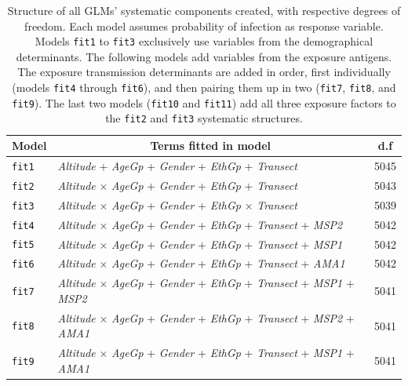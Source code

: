 \begin{table}[ht!]
\centering
\caption[Structure of systematic components used in the GLMs]{Structure of all GLMs' systematic components created, with respective degrees of freedom. Each model assumes probability of infection as response variable. Models \texttt{fit1} to \texttt{fit3} exclusively use variables from the demographical determinants. The following models add variables from the exposure antigens. The exposure transmission determinants are added in order, first individually (models \texttt{fit4} through \texttt{fit6}), and then pairing them up in two (\texttt{fit7}, \texttt{fit8}, and \texttt{fit9}). The last two models (\texttt{fit10} and \texttt{fit11}) add all three exposure factors to the \texttt{fit2} and \texttt{fit3} systematic structures.}
\label{tab:glm.formulas}
\begin{adjustbox}{width=\linewidth}
\begin{tabular}{llc} 
\toprule
Model   &  \multicolumn{1}{c}{Terms fitted in model}   &   d.f  \\
\midrule
\texttt{fit1}   & \textit{Altitude} + \textit{AgeGp} + \textit{Gender} + \textit{EthGp} + \textit{Transect}   & 5045   \\
\texttt{fit2}   & \textit{Altitude} $\times$ \textit{AgeGp} + \textit{Gender} + \textit{EthGp} + \textit{Transect}   & 5043   \\
\texttt{fit3}   & \textit{Altitude} $\times$ \textit{AgeGp} + \textit{Gender} + \textit{EthGp} $\times$ \textit{Transect}   & 5039   \\
\texttt{fit4}   & \textit{Altitude} $\times$ \textit{AgeGp} + \textit{Gender} + \textit{EthGp} + \textit{Transect} + \textit{MSP2}  & 5042   \\
\texttt{fit5}   & \textit{Altitude} $\times$ \textit{AgeGp} + \textit{Gender} + \textit{EthGp} + \textit{Transect} + \textit{MSP1}   & 5042   \\
\texttt{fit6}   & \textit{Altitude} $\times$ \textit{AgeGp} + \textit{Gender} + \textit{EthGp} + \textit{Transect} + \textit{AMA1}   & 5042   \\
\texttt{fit7}   & \textit{Altitude} $\times$ \textit{AgeGp} + \textit{Gender} + \textit{EthGp} + \textit{Transect} + \textit{MSP1} + \textit{MSP2}  & 5041   \\
\texttt{fit8}   & \textit{Altitude} $\times$ \textit{AgeGp} + \textit{Gender} + \textit{EthGp} + \textit{Transect} + \textit{MSP2} + \textit{AMA1}  & 5041   \\
\texttt{fit9}   & \textit{Altitude} $\times$ \textit{AgeGp} + \textit{Gender} + \textit{EthGp} + \textit{Transect} + \textit{MSP1} + \textit{AMA1}   & 5041   \\

\end{tabular}
\end{adjustbox}
\end{table}
